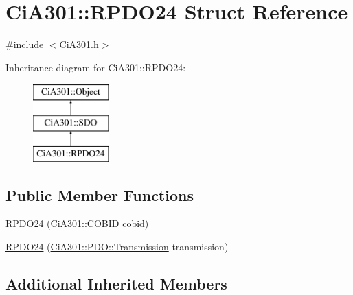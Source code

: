 \hypertarget{struct_ci_a301_1_1_r_p_d_o24}{\section{Ci\-A301\-:\-:R\-P\-D\-O24 Struct Reference}
\label{struct_ci_a301_1_1_r_p_d_o24}
}


{\ttfamily \#include $<$Ci\-A301.\-h$>$}

Inheritance diagram for Ci\-A301\-:\-:R\-P\-D\-O24\-:\begin{figure}[H]
\begin{center}
\leavevmode
\includegraphics[height=3.000000cm]{d4/df3/struct_ci_a301_1_1_r_p_d_o24}
\end{center}
\end{figure}
\subsection*{Public Member Functions}
\begin{DoxyCompactItemize}
\item 
\hyperlink{struct_ci_a301_1_1_r_p_d_o24_a26e539db8d60fcc21ef6187b6c3fb7d3}{R\-P\-D\-O24} (\hyperlink{namespace_ci_a301_aec5b5dbb2b60d2837c60499f6f297aa7}{Ci\-A301\-::\-C\-O\-B\-I\-D} cobid)
\item 
\hyperlink{struct_ci_a301_1_1_r_p_d_o24_aa3aed7c62bf6f15b57e5159a14907102}{R\-P\-D\-O24} (\hyperlink{namespace_ci_a301_1_1_p_d_o_a6c7a5941fe4f869dd1703fb7ce7f6549}{Ci\-A301\-::\-P\-D\-O\-::\-Transmission} transmission)
\end{DoxyCompactItemize}
\subsection*{Additional Inherited Members}


